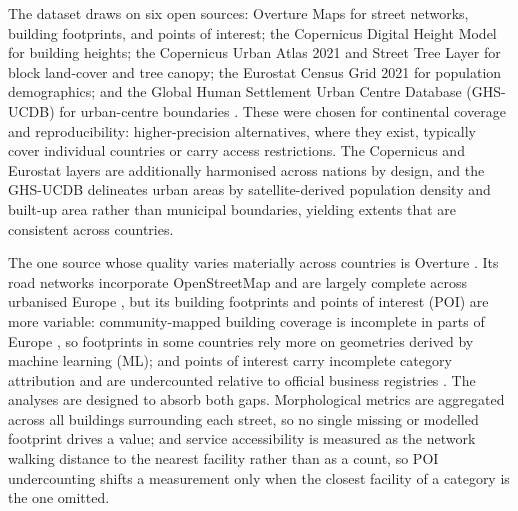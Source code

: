\documentclass[review,authoryear]{elsarticle}
\begin{document}
The dataset draws on six open sources: Overture Maps for street networks, building footprints, and points of interest; the Copernicus Digital Height Model for building heights; the Copernicus Urban Atlas 2021 and Street Tree Layer for block land-cover and tree canopy; the Eurostat Census Grid 2021 for population demographics; and the Global Human Settlement Urban Centre Database (GHS-UCDB) for urban-centre boundaries \citep{florczyk2019ghs}. These were chosen for continental coverage and reproducibility: higher-precision alternatives, where they exist, typically cover individual countries or carry access restrictions. The Copernicus and Eurostat layers are additionally harmonised across nations by design, and the GHS-UCDB delineates urban areas by satellite-derived population density and built-up area rather than municipal boundaries, yielding extents that are consistent across countries.

The one source whose quality varies materially across countries is Overture \citep{overture2026}. Its road networks incorporate OpenStreetMap and are largely complete across urbanised Europe \citep{barringtonleigh2017world}, but its building footprints and points of interest (POI) are more variable: community-mapped building coverage is incomplete in parts of Europe \citep{herfort2023spatio}, so footprints in some countries rely more on geometries derived by machine learning (ML); and points of interest carry incomplete category attribution \citep{ballantyne2024overture} and are undercounted relative to official business registries \citep{simons2024soar}. The analyses are designed to absorb both gaps. Morphological metrics are aggregated across all buildings surrounding each street, so no single missing or modelled footprint drives a value; and service accessibility is measured as the network walking distance to the nearest facility rather than as a count, so POI undercounting shifts a measurement only when the closest facility of a category is the one omitted.
\end{document}
